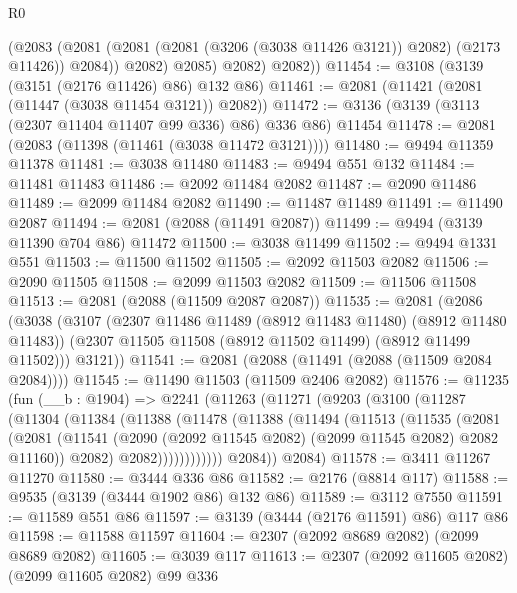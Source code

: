 \begin{lexlean}{R0}
\begin{coremodule}
              (@2083
                (@2081 (@2081 (@2081 (@3206 (@3038 @11426 @3121)) @2082) (@2173 @11426)) @2084))
              @2082)
            @2085)
          @2082)
        @2082))
@11454 := @3108 (@3139 (@3151 (@2176 @11426) @86) @132 @86)
@11461 := @2081 (@11421 (@2081 (@11447 (@3038 @11454 @3121)) @2082))
@11472 := @3136 (@3139 (@3113 (@2307 @11404 @11407 @99 @336) @86) @336 @86) @11454
@11478 := @2081 (@2083 (@11398 (@11461 (@3038 @11472 @3121))))
@11480 := @9494 @11359 @11378
@11481 := @3038 @11480
@11483 := @9494 @551 @132
@11484 := @11481 @11483
@11486 := @2092 @11484 @2082
@11487 := @2090 @11486
@11489 := @2099 @11484 @2082
@11490 := @11487 @11489
@11491 := @11490 @2087
@11494 := @2081 (@2088 (@11491 @2087))
@11499 := @9494 (@3139 @11390 @704 @86) @11472
@11500 := @3038 @11499
@11502 := @9494 @1331 @551
@11503 := @11500 @11502
@11505 := @2092 @11503 @2082
@11506 := @2090 @11505
@11508 := @2099 @11503 @2082
@11509 := @11506 @11508
@11513 := @2081 (@2088 (@11509 @2087 @2087))
@11535 := @2081
    (@2086
      (@3038
        (@3107
          (@2307 @11486 @11489 (@8912 @11483 @11480) (@8912 @11480 @11483))
          (@2307 @11505 @11508 (@8912 @11502 @11499) (@8912 @11499 @11502)))
        @3121))
@11541 := @2081 (@2088 (@11491 (@2088 (@11509 @2084 @2084))))
@11545 := @11490 @11503 (@11509 @2406 @2082)
@11576 := @11235
    (fun (__b : @1904) =>
    @2241
      (@11263
        (@11271
          (@9203
            (@3100
              (@11287
                (@11304
                  (@11384
                    (@11388
                      (@11478
                        (@11388
                          (@11494
                            (@11513
                              (@11535
                                (@2081
                                  (@2081
                                    (@11541
                                      (@2090
                                        (@2092 @11545 @2082)
                                        (@2099 @11545 @2082)
                                        @2082
                                        @11160))
                                    @2082)
                                  @2082))))))))))))
          @2084))
      @2084)
@11578 := @3411 @11267 @11270
@11580 := @3444 @336 @86
@11582 := @2176 (@8814 @117)
@11588 := @9535 (@3139 (@3444 @1902 @86) @132 @86)
@11589 := @3112 @7550
@11591 := @11589 @551 @86
@11597 := @3139 (@3444 (@2176 @11591) @86) @117 @86
@11598 := @11588 @11597
@11604 := @2307 (@2092 @8689 @2082) (@2099 @8689 @2082)
@11605 := @3039 @117
@11613 := @2307 (@2092 @11605 @2082) (@2099 @11605 @2082) @99 @336

\end{coremodule}
\end{lexlean}
